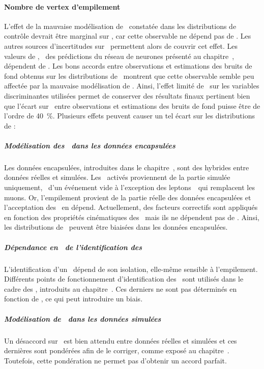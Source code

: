 {\paragraph{Nombre de vertex d'empilement}
L'effet de la mauvaise modélisation de \Npu\ constatée dans les distributions de contrôle
devrait être marginal sur \mTtot,
car cette observable ne dépend pas de \Npu.
Les autres sources d'incertitudes sur \mTtot\ permettent alors de couvrir cet effet.
Les valeurs de \mml, \ie\ des prédictions du réseau de neurones présenté au chapitre~,
dépendent de \Npu.
Les bons accords
entre observations et estimations des bruits de fond
obtenus sur les distributions de \mml\
montrent que cette observable semble peu affectée par la mauvaise modélisation de \Npu.
Ainsi,
l'effet limité de \Npu\ sur les variables discriminantes utilisées
permet de conserver des résultats finaux pertinent
bien que l'écart sur \Npu\
entre observations et estimations des bruits de fond
puisse être de l'ordre de \SI{40}{\%}.
Plusieurs effets peuvent causer un tel écart sur les distributions de \Npu:
\subparagraph{Modélisation des \HLTpaths\ dans les données encapsulées}
Les données encapsulées,
introduites dans le chapitre~\refChHTT,
sont des hybrides entre données réelles et simulées.
Les \HLTpaths\ activés proviennent de la partie simulée uniquement,
\ie\ d'un événement vide à l'exception des leptons~\tau\ qui remplacent les muons.
Or, l'empilement provient de la partie réelle des données encapsulées
et l'acceptation des \HLTpaths\ en dépend.
Actuellement,
des facteurs correctifs sont appliqués en fonction des propriétés cinématiques des \tau\
mais ils ne dépendent pas de \Npu.
Ainsi, les distributions de \Npu\ peuvent être biaisées dans les données encapsulées.
\subparagraph{Dépendance en \Npu\ de l'identification des \tauh}
L'identification d'un \tauh\ dépend de son isolation,
elle-même sensible à l'empilement.
Différents points de fonctionnement
d'identification des \tauh\ sont utilisés dans le cadre des \fakefactors,
introduits au chapitre~\refChHTT.
Ces derniers ne sont pas déterminés en fonction de \Npu,
ce qui peut introduire un biais.
\subparagraph{Modélisation de \Npu\ dans les données simulées}
Un désaccord sur \Npu\ est bien attendu entre données réelles et simulées
et ces dernières sont pondérées afin de le corriger, comme exposé au chapitre~.
Toutefois, cette pondération ne permet pas d'obtenir un accord parfait.

\def\EMBFFchoice{emb_ff}

}{
}